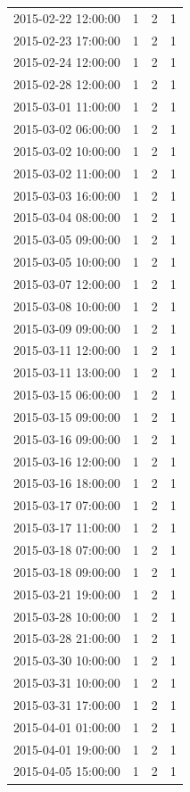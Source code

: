 \begin{tabular}{lrrr}
2015-02-22 12:00:00 & 1 & 2 & 1 \\
2015-02-23 17:00:00 & 1 & 2 & 1 \\
2015-02-24 12:00:00 & 1 & 2 & 1 \\
2015-02-28 12:00:00 & 1 & 2 & 1 \\
2015-03-01 11:00:00 & 1 & 2 & 1 \\
2015-03-02 06:00:00 & 1 & 2 & 1 \\
2015-03-02 10:00:00 & 1 & 2 & 1 \\
2015-03-02 11:00:00 & 1 & 2 & 1 \\
2015-03-03 16:00:00 & 1 & 2 & 1 \\
2015-03-04 08:00:00 & 1 & 2 & 1 \\
2015-03-05 09:00:00 & 1 & 2 & 1 \\
2015-03-05 10:00:00 & 1 & 2 & 1 \\
2015-03-07 12:00:00 & 1 & 2 & 1 \\
2015-03-08 10:00:00 & 1 & 2 & 1 \\
2015-03-09 09:00:00 & 1 & 2 & 1 \\
2015-03-11 12:00:00 & 1 & 2 & 1 \\
2015-03-11 13:00:00 & 1 & 2 & 1 \\
2015-03-15 06:00:00 & 1 & 2 & 1 \\
2015-03-15 09:00:00 & 1 & 2 & 1 \\
2015-03-16 09:00:00 & 1 & 2 & 1 \\
2015-03-16 12:00:00 & 1 & 2 & 1 \\
2015-03-16 18:00:00 & 1 & 2 & 1 \\
2015-03-17 07:00:00 & 1 & 2 & 1 \\
2015-03-17 11:00:00 & 1 & 2 & 1 \\
2015-03-18 07:00:00 & 1 & 2 & 1 \\
2015-03-18 09:00:00 & 1 & 2 & 1 \\
2015-03-21 19:00:00 & 1 & 2 & 1 \\
2015-03-28 10:00:00 & 1 & 2 & 1 \\
2015-03-28 21:00:00 & 1 & 2 & 1 \\
2015-03-30 10:00:00 & 1 & 2 & 1 \\
2015-03-31 10:00:00 & 1 & 2 & 1 \\
2015-03-31 17:00:00 & 1 & 2 & 1 \\
2015-04-01 01:00:00 & 1 & 2 & 1 \\
2015-04-01 19:00:00 & 1 & 2 & 1 \\
2015-04-05 15:00:00 & 1 & 2 & 1 \\

\end{tabular}
